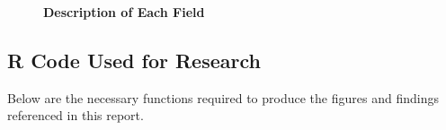 \documentclass[]{article}
\begin{document}
\begin{figure}[!ht]
    \caption{ \textbf{Description of Each Field} }
    \begin{center}
    \end{center}
    \label{fig:datasets_explained}
\end{figure}

\newpage

\subsection{R Code Used for Research}
\label{sec:appendix-setup}

Below are the necessary functions required to produce the figures and
findings referenced in this report.
\end{document}
